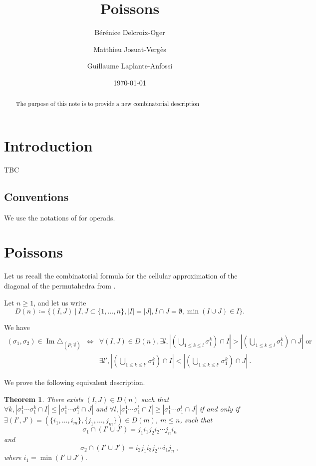 \documentclass[11pt]{amsart}
\title{Poissons}
\author{B\'er\'enice Delcroix-Oger}
\author{Matthieu Josuat-Verg\`es}
\author{Guillaume Laplante-Anfossi}
\date{\today}
\newtheorem{thm}{Theorem}[section]
\theoremstyle{definition}
\theoremstyle{remark}
\numberwithin{equation}{section}
\newcommand{\0}{\color{blue}{\mathsf{0}}}
\DeclareMathOperator{\Ima}{Im} %
\begin{document}
\begin{abstract}
The purpose of this note is to provide a new combinatorial description 
\end{abstract}


\maketitle

\section{Introduction}

TBC

\subsection{Conventions}
We use the notations of \cite{LodayVallette12} for operads.

\section{Poissons}

Let us recall the combinatorial formula for the cellular approximation of the diagonal of the permutahedra from \cite{LA21}.

Let $n\geq 1$, and let us write \[ D(n) \coloneqq \{(I,J) \ | \ I,J\subset\{1,\ldots,n\}, |I|=|J|, I\cap J=\emptyset, \min(I\cup J)\in I \}. \] 

We have
\begin{eqnarray*}
    (\sigma_1,\sigma_2)\in \Ima\triangle_{(P,\vec v)} 
    & \iff & \forall (I,J) \in D(n), \exists l , 
    \left| \left(\bigcup_{1\leq k \leq l} \sigma_1^{k} \right)\cap I \right|
    >
    \left| \left(\bigcup_{1\leq k \leq l} \sigma_1^{k} \right)\cap J \right| \text{ or } \\
    && \exists l' , 
    \left| \left(\bigcup_{1\leq k \leq l'} \sigma_1^{k} \right)\cap I \right|
    <
    \left| \left(\bigcup_{1\leq k \leq l'} \sigma_1^{k} \right)\cap J \right|  \ .
\end{eqnarray*}

We prove the following equivalent description. 

\begin{thm} There exists $(I,J) \in D(n)$ such that $\forall k, |\sigma_1^1\cdots\sigma_1^k \cap I| \leq |\sigma_1^1\cdots\sigma_1^k \cap J|$ and $\forall l, |\sigma_1^1\cdots\sigma_1^l \cap I| \geq |\sigma_1^1\cdots\sigma_1^l \cap J|$ if and only if $\exists (I',J')=(\{i_1,\ldots,i_m\},\{j_1,\ldots,j_m\}) \in D(m)$, $m\leq n$, such that \[\sigma_1 \cap (I'\cup J')=j_1 i_1 j_2 i_2 \cdots j_n i_n \] and \[ \sigma_2 \cap (I'\cup J') = i_2 j_1 i_3 j_2 \cdots i_1 j_n \ , \] where $i_1 = \min (I' \cup J')$. 
\end{thm}
\end{document}
